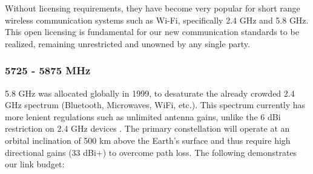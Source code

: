 \documentclass[11pt]{article}
\begin{document}
\noindent Without licensing requirements, they have become very popular for short range wireless communication systems such as Wi-Fi, specifically 2.4 GHz and 5.8 GHz.
This open licensing is fundamental for our new communication standards to be realized, remaining unrestricted and unowned by any single party.

\subsubsection{5725 - 5875 MHz}
\label{3.2.2}

5.8 GHz was allocated globally in 1999, to desaturate the already crowded 2.4 GHz spectrum (Bluetooth, Microwaves, WiFi, etc.).
This spectrum currently has more lenient regulations such as unlimited antenna gains, unlike the 6 dBi restriction on 2.4 GHz devices \cite{ISM_Limits}.
The primary constellation will operate at an orbital inclination of 500 km above the Earth's surface and thus require high directional gains (33 dBi+) to overcome path loss.
The following demonstrates our link budget:
\end{document}
